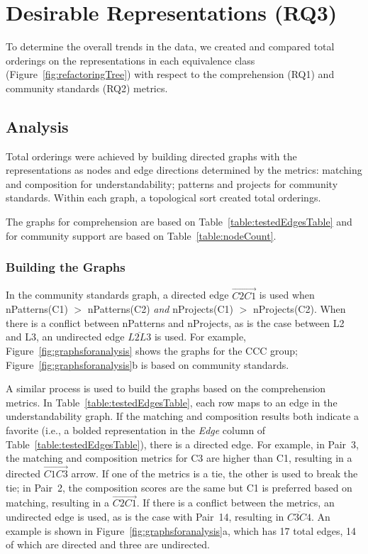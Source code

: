 

\section{Desirable Representations (RQ3)}
\label{sec:rq3}
To determine the overall trends in the data, we created and compared total orderings on the representations in each equivalence class (Figure~\ref{fig:refactoringTree}) with respect to the comprehension (RQ1) and community standards (RQ2) metrics.

\subsection{Analysis}
Total orderings were achieved by building directed graphs with the representations as nodes and edge directions determined by the metrics: matching and composition for understandability; patterns and projects for community standards. Within each graph, a topological sort created total orderings.

The graphs for comprehension are based on Table~\ref{table:testedEdgesTable} and for community support are based on Table~\ref{table:nodeCount}.



\subsubsection{Building the Graphs}
In the community standards graph, a directed edge $\overrightarrow{C2 C1}$ is used when nPatterns(C1) $>$ nPatterns(C2) \emph{and} nProjects(C1) $>$ nProjects(C2).
When there is a conflict between nPatterns and nProjects, as is the case between L2 and L3,
an undirected edge $\overline{L2L3}$ is used. %
For example, Figure~\ref{fig:graphsforanalysis} shows the graphs for the CCC group; Figure~\ref{fig:graphsforanalysis}b is based on community standards.

A similar process is used to build the graphs based on the comprehension metrics.
In Table~\ref{table:testedEdgesTable}, each row maps to an edge in the understandability graph.
If the matching and composition results both indicate a favorite (i.e., a bolded representation in the {\em Edge} column of Table~\ref{table:testedEdgesTable}), there is a directed edge. For example, in Pair~3, the matching and composition metrics for C3 are higher than C1, resulting in a directed $\overrightarrow{C1 C3}$ arrow. If one of the metrics is a tie, the other is used to break the tie; in Pair~2, the composition scores are the same but C1 is preferred based on matching, resulting in a $\overrightarrow{C2 C1}$. If there is a conflict between the metrics, an undirected edge is used, as is the case with Pair~14, resulting in $\overline{C3 C4}$.
An example is shown in Figure~\ref{fig:graphsforanalysis}a, which has 17 total edges, 14 of which are directed and three are undirected.

